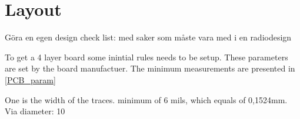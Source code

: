 \section{Layout}
Göra en egen design check list: med saker som måste vara med i en radiodesign 

To get a 4 layer board some inintial rules needs to be setup. These parameters are set by the board manufactuer. The minimum measurements are presented in \autoref{PCB_param}

One is the width of the traces. minimum of 6 mils, which equals of 0,1524mm. 
Via diameter: 10
 
